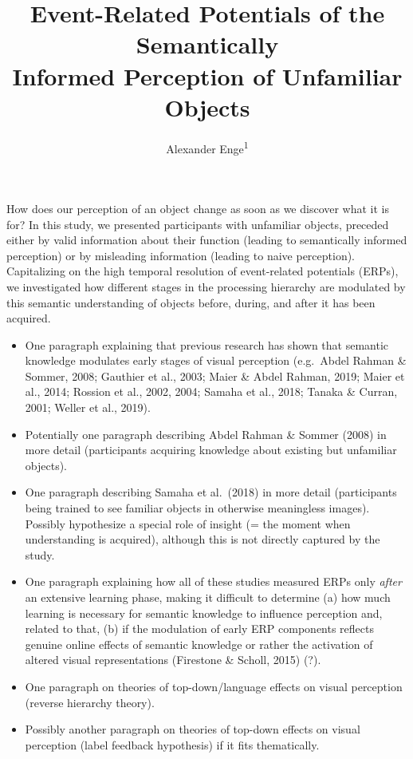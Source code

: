 \documentclass[
  english,
  man,11pt,floatsintext]{apa7}
\title{Event-Related Potentials of the Semantically\\
Informed Perception of Unfamiliar Objects}
\author{Alexander Enge\textsuperscript{1}}
\date{}
\affiliation{\vspace{0.5cm}\textsuperscript{1} Humboldt-Universität zu Berlin}
\begin{document}
\maketitle

How does our perception of an object change as soon as we discover what it is for? In this study, we presented participants with unfamiliar objects, preceded either by valid information about their function (leading to semantically informed perception) or by misleading information (leading to naive perception). Capitalizing on the high temporal resolution of event-related potentials (ERPs), we investigated how different stages in the processing hierarchy are modulated by this semantic understanding of objects before, during, and after it has been acquired.

\begin{itemize}
\item
  One paragraph explaining that previous research has shown that semantic knowledge modulates early stages of visual perception (e.g.~Abdel Rahman \& Sommer, 2008; Gauthier et al., 2003; Maier \& Abdel Rahman, 2019; Maier et al., 2014; Rossion et al., 2002, 2004; Samaha et al., 2018; Tanaka \& Curran, 2001; Weller et al., 2019).
\item
  Potentially one paragraph describing Abdel Rahman \& Sommer (2008) in more detail (participants acquiring knowledge about existing but unfamiliar objects).
\item
  One paragraph describing Samaha et al.~(2018) in more detail (participants being trained to see familiar objects in otherwise meaningless images). Possibly hypothesize a special role of insight (= the moment when understanding is acquired), although this is not directly captured by the study.
\item
  One paragraph explaining how all of these studies measured ERPs only \emph{after} an extensive learning phase, making it difficult to determine (a) how much learning is necessary for semantic knowledge to influence perception and, related to that, (b) if the modulation of early ERP components reflects genuine online effects of semantic knowledge or rather the activation of altered visual representations (Firestone \& Scholl, 2015) (?).
\item
  One paragraph on theories of top-down/language effects on visual perception (reverse hierarchy theory).
\item
  Possibly another paragraph on theories of top-down effects on visual perception (label feedback hypothesis) if it fits thematically.

\end{itemize}
\end{document}
